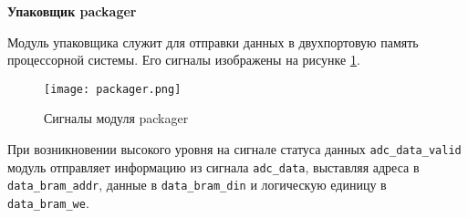 \textbf{Упаковщик packager}\par
Модуль упаковщика служит для отправки данных в двухпортовую память процессорной системы. Его сигналы изображены на рисунке \ref{fig:packager}.\par 
\begin{figure}[ht]
    \centering
    \texttt{[image: packager.png]}
    \caption{Сигналы модуля packager}
    \label{fig:packager}
\end{figure}
При возникновении высокого уровня на сигнале статуса данных \texttt{adc\_data\_valid} модуль отправляет информацию из сигнала \texttt{adc\_data}, выставляя адреса в \texttt{data\_bram\_addr}, данные в \texttt{data\_bram\_din} и логическую единицу в \texttt{data\_bram\_we}.\par

